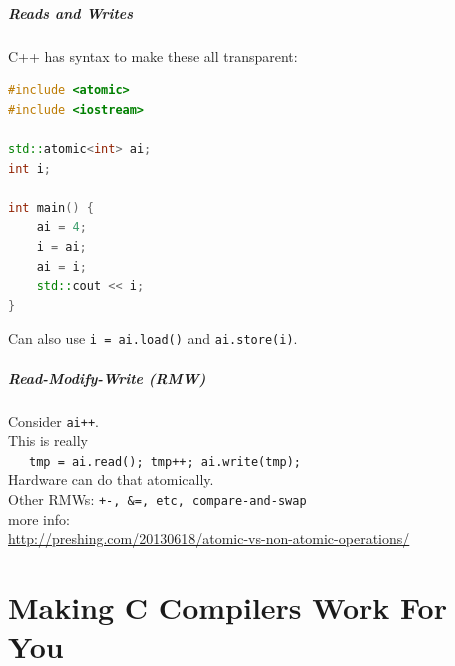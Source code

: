 \documentclass[aspectratio=43]{beamer}
\newenvironment{changemargin}[1]{%
  \begin{list}{}{%
    \setlength{\topsep}{0pt}%
    \setlength{\leftmargin}{#1}%
    \setlength{\rightmargin}{1em}
    \setlength{\listparindent}{\parindent}%
    \setlength{\itemindent}{\parindent}%
    \setlength{\parsep}{\parskip}%
  }%
  \item[]}{\end{list}}
\begin{document}
\begin{frame}[fragile]
  \frametitle{Reads and Writes}

  \begin{changemargin}{2cm}
    C++ has syntax to make these all transparent:
\begin{lstlisting}[language=C++]
#include <atomic>
#include <iostream>

std::atomic<int> ai;
int i;

int main() {
    ai = 4;
    i = ai;
    ai = i;
    std::cout << i;
}
\end{lstlisting}
Can also use {\tt i = ai.load()} and {\tt ai.store(i)}.
  \end{changemargin}
\end{frame}

\begin{frame}
  \frametitle{Read-Modify-Write (RMW)}

  \begin{changemargin}{2cm}
    Consider {\tt ai++}.\\[1em]
    This is really \\
    ~~~{\tt tmp = ai.read(); tmp++; ai.write(tmp); }\\[1em]
    Hardware can do that atomically.\\[1em]
    Other RMWs: {\tt +-, \&=, etc, compare-and-swap}\\[2em]

    {\small
      more info:\\ \url{http://preshing.com/20130618/atomic-vs-non-atomic-operations/}
      }
  \end{changemargin}
\end{frame}


\part{Making C Compilers Work For You}
\frame{\partpage}
\end{document}
